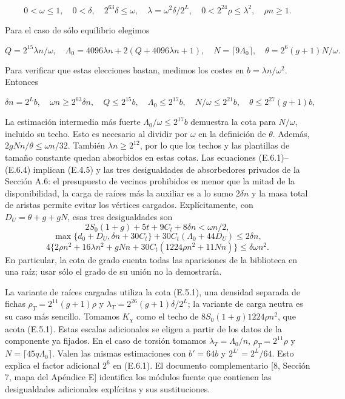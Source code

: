 \documentclass[spanish,11pt,a4paper]{article}
\begin{document}
\[0<\omega\le1,\quad 0<\delta,\quad2^{63}\delta\le\omega,\quad
\lambda=\omega^2\delta/2^L,\quad
0<2^{24}\rho\le\lambda^2,\quad\rho n\ge1.
\tag{E.6.2}\]

Para el caso de sólo equilibrio elegimos

\[Q=2^{15}\lambda n/\omega,\quad
\Lambda_0=4096\lambda n+2(Q+4096\lambda n+1),\quad
N=\lceil9\Lambda_0\rceil,\quad
\theta=2^6(g+1)N/\omega.
\tag{E.6.3}\]

Para verificar que estas elecciones bastan, medimos los costes en \(b=\lambda n/\omega^2\). Entonces

\[\delta n=2^Lb,\quad \omega n\ge2^{63}\delta n,\quad
Q\le2^{15}b,\quad \Lambda_0\le2^{17}b,\quad
N/\omega\le2^{21}b,\quad\theta\le2^{27}(g+1)b,
\tag{E.6.4}\]

La estimación intermedia más fuerte \(\Lambda_0/\omega\le2^{17}b\) demuestra la cota para \(N/\omega\), incluido su techo. Esto es necesario al dividir por \(\omega\) en la definición de \(\theta\). Además, \(2gNn/\theta\le\omega n/32\). También \(\lambda n\ge2^{12}\), por lo que los techos y las plantillas de tamaño constante quedan absorbidos en estas cotas. Las ecuaciones (E.6.1)--(E.6.4) implican (E.4.5) y las tres desigualdades de absorbedores privados de la Sección A.6: el presupuesto de vecinos prohibidos es menor que la mitad de la disponibilidad, la carga de raíces más la auxiliar es a lo sumo \(2\delta n\) y la masa total de aristas permite evitar los vértices cargados. Explícitamente, con \(D_U=\theta+g+gN\), esas tres desigualdades son \[2S_0(1+g)+5t+9C_t+8\delta n<\omega n/2,\] \[\max\{d_0+D_U,\delta n+30C_t\}
+30C_t(\Lambda_0+44D_U)\le2\delta n,\] \[4\{2\rho n^2+16\lambda n^2+gNn
+30C_t(1224\rho n^2+11Nn)\}\le\delta\omega n^2.
\tag{E.6.5}\] En particular, la cota de grado cuenta todas las apariciones de la biblioteca en una raíz; usar sólo el grado de su unión no la demostraría.

La variante de raíces cargadas utiliza la cota (E.5.1), una densidad separada de fichas \(\rho_T=2^{11}(g+1)\rho\) y \(\lambda_T=2^{26}(g+1)\delta/2^L\); la variante de carga neutra es su caso más sencillo. Tomamos \(K_\chi\) como el techo de \(8S_0(1+g)1224\rho n^2\), que acota (E.5.1). Estas escalas adicionales se eligen a partir de los datos de la componente ya fijados. En el caso de torsión tomamos \(\lambda_T=\Lambda_0/n\), \(\rho_T=2^{11}\rho\) y \(N=\lceil45q\Lambda_0\rceil\). Valen las mismas estimaciones con \(b'=64b\) y \(2^{L'}=2^L/64\). Esto explica el factor adicional \(2^6\) en (E.6.1). El documento complementario {[}8, Sección 7, mapa del Apéndice E{]} identifica los módulos fuente que contienen las desigualdades adicionales explícitas y sus sustituciones.
\end{document}
